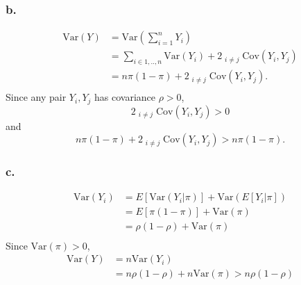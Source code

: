 \documentclass{article}
\begin{document}
\subsubsection{b.}
\begin{align*}
\mathrm{Var}(Y) &= \mathrm{Var}\left(\sum_{i=1}^n Y_i\right) \\
&=\sum_{i\in 1,..,n} \mathrm{Var}(Y_i) + 2\mathop{\sum_{i\in 1,..,n}\sum_{j\in 1,..,n}}_{i\neq j} \mathrm{Cov}(Y_i, Y_j) \\
&=n\pi(1-\pi) + 2\mathop{\sum_{i\in 1,..,n}\sum_{j\in 1,..,n}}_{i\neq j} \mathrm{Cov}(Y_i, Y_j). \\
\end{align*}
Since any pair $Y_i, Y_j$ has covariance $\rho>0$, 
\[2\mathop{\sum_{i\in 1,..,n}\sum_{j\in 1,..,n}}_{i\neq j} \mathrm{Cov}(Y_i, Y_j) > 0\]
and
\[n\pi(1-\pi) + 2\mathop{\sum_{i\in 1,..,n}\sum_{j\in 1,..,n}}_{i\neq j} \mathrm{Cov}(Y_i, Y_j) > n\pi(1-\pi).\]

\subsubsection{c.}
\begin{align*}
\mathrm{Var}(Y_i) &= E\left[\mathrm{Var}(Y_i|\pi)\right] + \mathrm{Var}\left(E[Y_i|\pi]\right) \\
&= E\left[\pi(1-\pi)\right] + \mathrm{Var}(\pi) \\
&= \rho(1-\rho) + \mathrm{Var}(\pi) \\
\end{align*}
Since $\mathrm{Var}(\pi) >0$,
\begin{align*}
\mathrm{Var}(Y) &= n\mathrm{Var}(Y_i) \\
&= n\rho(1-\rho) + n\mathrm{Var}(\pi) > n\rho(1-\rho)
\end{align*}
\end{document}
